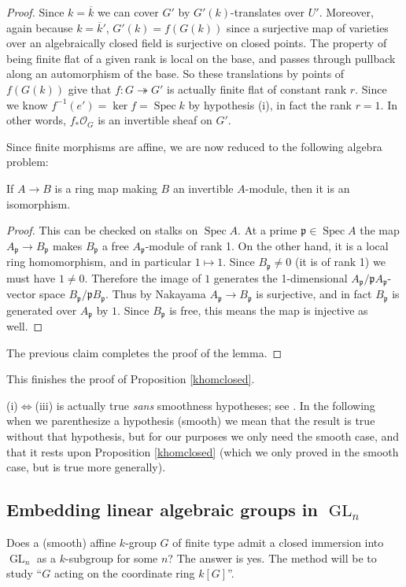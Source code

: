\documentclass[10pt]{article}
\newcommand{\cO}{\mathcal{O}}
\newcommand{\GL}{\operatorname{GL}}
\renewcommand{\(}{\left(}
\renewcommand{\)}{\right)}
\renewcommand{\bar}{\overline}
\newcommand{\Spec}{\operatorname{Spec}}
\newcommand{\onto}{\twoheadrightarrow }
\newcommand{\p}{\mathfrak{p}}
\numberwithin{thm}{subsection}
\begin{document}
\begin{proof}
Since $k=\bar k$ we can cover $G'$ by $G'(k)$-translates over $U'$.
Moreover, again because $k=\bar k'$, $G'(k)=f(G(k))$
since a surjective map of varieties over an algebraically closed field
is surjective on closed points.
The property of being finite flat of a given rank is local on the base, and passes through pullback along an automorphism of the base.
So these translations by points of $f(G(k))$
give that $f:G\onto G'$ is actually finite flat of constant rank $r$.
Since we know $f^{-1}(e')=\ker f = \Spec k$ by hypothesis (i),
in fact the rank $r=1$.
In other words, $f_*\cO_G$ is an invertible sheaf on $G'$.

Since finite morphisms are affine, we are now reduced to the following algebra problem:
\begin{claim}
If $A\to B$ is a ring map making $B$ an invertible $A$-module,
then it is an isomorphism.
\end{claim}
\begin{proof}
This can be checked on stalks on $\Spec A$.
At a prime $\p\in \Spec A$
the map $A_\p\to B_\p$ makes $B_\p$ a free $A_\p$-module of rank 1.
On the other hand, it is a local ring homomorphism,
and in particular $1\mapsto 1$.
Since $B_\p\neq 0$ (it is of rank 1)
we must have $1\neq 0$.
Therefore the image of $1$
generates the 1-dimensional $A_\p/\p A_\p$-vector space
$B_\p/\p B_\p$.
Thus by Nakayama $A_\p\to B_\p$ is surjective,
and in fact $B_\p$ is generated over $A_\p$ by $1$.
Since $B_\p$ is free, this means the map is injective as well.
\end{proof}
The previous claim completes the proof of the lemma.
\end{proof}
This finishes the proof of Proposition \ref{khomclosed}.
\begin{rem}\label{(smooth)}(i)$\Leftrightarrow$(iii) is actually true \textit{sans} smoothness hypotheses; see
\cite[VI$_{\rm{A}}$, 1.4.2]{sga3}. In the following when we parenthesize a hypothesis (smooth) we mean that the result is true without that hypothesis, but for our purposes we only need the smooth case, and that it rests upon Proposition \ref{khomclosed} (which we only proved in the smooth case, but is true more generally).
\end{rem}
\subsection{Embedding linear algebraic groups in $\GL_n$}
Does a (smooth) affine $k$-group $G$ of finite type admit a closed immersion into $\GL_n$ 
as a $k$-subgroup for some $n$?
The answer is yes. The method will be to study ``$G$ acting on the coordinate
ring $k[G]$''.
\end{document}
